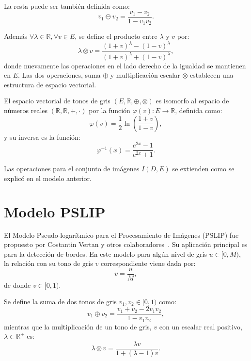 La resta puede ser tambi\'en definida como:
\begin{equation}
	v_1\ominus v_2=\frac{v_1-v_2}{1-v_1v_2}.
\end{equation}

Adem\'as $\forall \lambda \in \mathbb{R}, \forall v \in E $, se define el producto entre $\lambda$ y $v$ por:
\begin{equation}
	\lambda \otimes v =\frac{(1+v)^\lambda-(1-v)^\lambda}{(1+v)^\lambda+(1-v)^\lambda},
\end{equation}
donde nuevamente las operaciones en el lado derecho de la igualdad se mantienen en $E$. Las dos operaciones, suma $\oplus$ y multiplicación escalar $\otimes$ establecen una estructura de espacio vectorial.

El espacio vectorial de tonos de gris $(E, \mathbb{R}, \oplus, \otimes)$ es isomorfo al espacio de números reales $(\mathbb{R},\mathbb{R}, +, \cdot)$ por la función $\varphi(v) : E \rightarrow \mathbb{R}$, definida como:
\begin{equation}
	\varphi(v)=\frac{1}{2}\ln\left(\frac{1+v}{1-v}\right),
\end{equation}
y su inversa es la funci\'on:
\begin{equation}
	\varphi^{-1}(x)=\frac{e^{2x}-1}{e^{2x}+1}.
\end{equation}

Las operaciones para el conjunto de im\'agenes $I(D,E)$ se extienden como se explic\'o en el modelo anterior.

\section{Modelo PSLIP}

El Modelo Pseudo-logar\'itmico para el Procesamiento de Im\'agenes (PSLIP) fue propuesto por Costantin Vertan y otros colaboradores~\cite{vertan2008pseudo}. Su aplicaci\'on principal es para la detecci\'on de bordes. En este modelo para alg\'un nivel de gris $u\in[0,M)$, la relaci\'on con su tono de gris $v$ correspondiente viene dada por:
\begin{equation}
	v = \frac{u}{M},
\end{equation}
de donde $v\in[0,1)$.

Se define la suma de dos tonos de gris $v_1,v_2\in[0,1)$ como:
\begin{equation}
	v_1\oplus v_2=\frac{v_1 + v_2 - 2v_1v_2}{1-v_1v_2},
\end{equation}
mientras que la multiplicación de un tono de gris, $v$ con un escalar real positivo, $\lambda \in \mathbb{R}^+$ es:
\begin{equation}
	\lambda \otimes v = \frac{\lambda v}{1+(\lambda-1)v}.
\end{equation}

